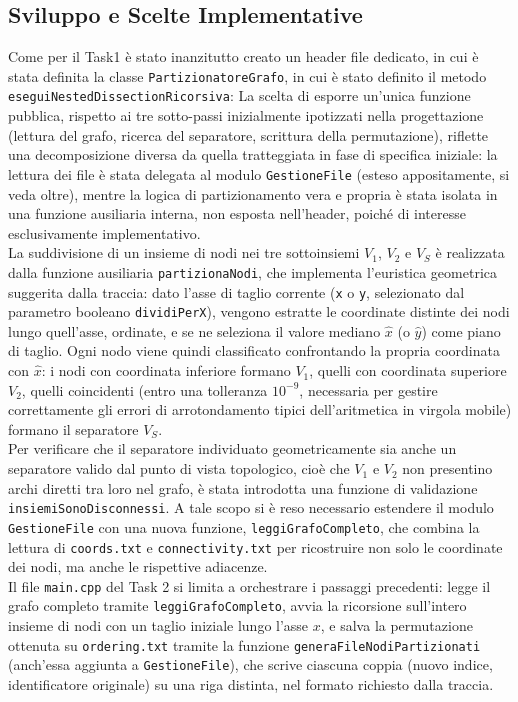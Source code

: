 \documentclass[twocolumn]{article}
\begin{document}
\subsection{Sviluppo e Scelte Implementative}
Come per il Task1 è stato inanzitutto creato un header file dedicato, in cui 
è stata definita la classe \texttt{PartizionatoreGrafo}, in cui è stato definito il metodo \texttt{eseguiNestedDissectionRicorsiva}:
La scelta di esporre un'unica funzione pubblica, rispetto ai tre sotto-passi
inizialmente ipotizzati nella progettazione (lettura del grafo, ricerca del
separatore, scrittura della permutazione), riflette una decomposizione diversa
da quella tratteggiata in fase di specifica iniziale: la lettura dei file è stata
delegata al modulo \texttt{GestioneFile} (esteso appositamente, si veda oltre),
mentre la logica di partizionamento vera e propria è stata isolata in una
funzione ausiliaria interna, non esposta nell'header, poiché di interesse
esclusivamente implementativo.\\
La suddivisione di un insieme di nodi nei tre sottoinsiemi $V_1$, $V_2$ e $V_S$
è realizzata dalla funzione ausiliaria \texttt{partizionaNodi}, che implementa
l'euristica geometrica suggerita dalla traccia: dato l'asse di taglio corrente
(\texttt{x} o \texttt{y}, selezionato dal parametro booleano \texttt{dividiPerX}),
vengono estratte le coordinate distinte dei nodi lungo quell'asse, ordinate, e
se ne seleziona il valore mediano $\hat{x}$ (o $\hat{y}$) come piano di taglio.
Ogni nodo viene quindi classificato confrontando la propria coordinata con
$\hat{x}$: i nodi con coordinata inferiore formano $V_1$, quelli con coordinata
superiore $V_2$, quelli coincidenti (entro una tolleranza $10^{-9}$, necessaria
per gestire correttamente gli errori di arrotondamento tipici
dell'aritmetica in virgola mobile) formano il separatore $V_S$.\\
Per verificare che il separatore individuato geometricamente sia anche un
separatore valido dal punto di vista topologico, cioè che $V_1$ e $V_2$ non
presentino archi diretti tra loro nel grafo, è stata introdotta una
funzione di validazione \texttt{insiemiSonoDisconnessi}. A tale scopo si è reso
necessario estendere il modulo \texttt{GestioneFile} con una nuova funzione,
\texttt{leggiGrafoCompleto}, che combina la lettura di \texttt{coords.txt} e
\texttt{connectivity.txt} per ricostruire non solo le coordinate dei nodi, ma
anche le rispettive adiacenze.\\
Il file \texttt{main.cpp} del Task 2 si limita a orchestrare i passaggi
precedenti: legge il grafo completo tramite \texttt{leggiGrafoCompleto}, avvia
la ricorsione sull'intero insieme di nodi con un taglio iniziale lungo l'asse
$x$, e salva la permutazione ottenuta su \texttt{ordering.txt} tramite la
funzione \texttt{generaFileNodiPartizionati} (anch'essa aggiunta a
\texttt{GestioneFile}), che scrive ciascuna coppia (nuovo indice, identificatore
originale) su una riga distinta, nel formato richiesto dalla traccia.\\
\end{document}
